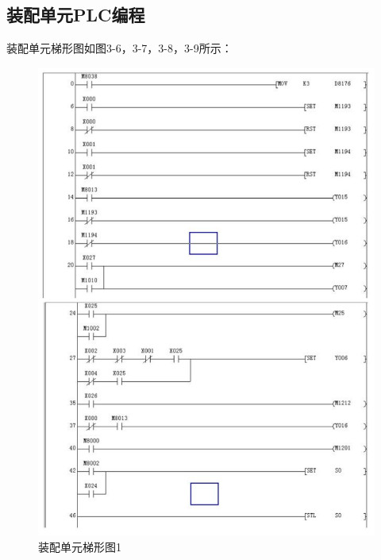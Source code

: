 \documentclass[12pt]{article}
\begin{document}
\subsection{装配单元PLC编程}
装配单元梯形图如图3-6，3-7，3-8，3-9所示：
\begin{figure}[htbp]
    \centering
    \includegraphics[scale=0.9]{fig/PLC1.png}
    \caption{装配单元梯形图1}
\end{figure} 
\end{document}
